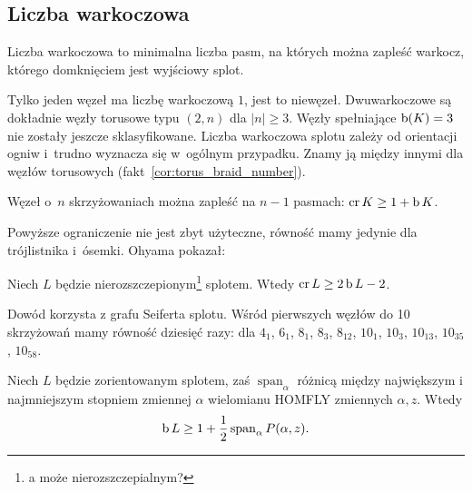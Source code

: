
\subsection{Liczba warkoczowa}
%

\begin{definition}
\label{def:braid_number}%
    Liczba warkoczowa to minimalna liczba pasm, na których można zapleść warkocz, którego domknięciem jest wyjściowy splot.
\end{definition}

Tylko jeden węzeł ma liczbę warkoczową $1$, jest to niewęzeł.
Dwuwarkoczowe są dokładnie węzły torusowe typu $(2, n)$ dla $|n| \ge 3$.
Węzły spełniające $\operatorname{b} (K) = 3$ nie zostały jeszcze sklasyfikowane.
Liczba warkoczowa splotu zależy od orientacji ogniw i~trudno wyznacza się w~ogólnym przypadku.
Znamy ją między innymi dla węzłów torusowych (fakt~\ref{cor:torus_braid_number}).

\begin{proposition}
    Węzeł o~$n$ skrzyżowaniach można zapleść na $n - 1$ pasmach: $\operatorname{cr} K \ge 1 + \operatorname{b} K$.
\end{proposition}

Powyższe ograniczenie nie jest zbyt użyteczne, równość mamy jedynie dla trójlistnika i~ósemki.
Ohyama \cite{ohyama93} pokazał:
%

\begin{proposition}
    Niech $L$ będzie nierozszczepionym\footnote{a może nierozszczepialnym?} splotem.
    Wtedy $\operatorname{cr} L \ge 2 \operatorname{b} L - 2$.
\end{proposition}

Dowód korzysta z grafu Seiferta splotu.
%
Wśród pierwszych węzłów do 10 skrzyżowań mamy równość dziesięć razy: dla $4_1$, $6_1$, $8_1$, $8_3$, $8_{12}$, $10_1$, $10_3$, $10_{13}$, $10_{35}$, $10_{58}$.

\begin{proposition}
%
    Niech $L$ będzie zorientowanym splotem, zaś $\operatorname{span}_\alpha$ różnicą między największym i najmniejszym stopniem zmiennej $\alpha$ wielomianu HOMFLY zmiennych $\alpha, z$.
    Wtedy
    \begin{equation}
        \operatorname{b} L \ge 1 + \frac 1 2 \operatorname{span}_\alpha P(\alpha, z).
    \end{equation}
\end{proposition}

